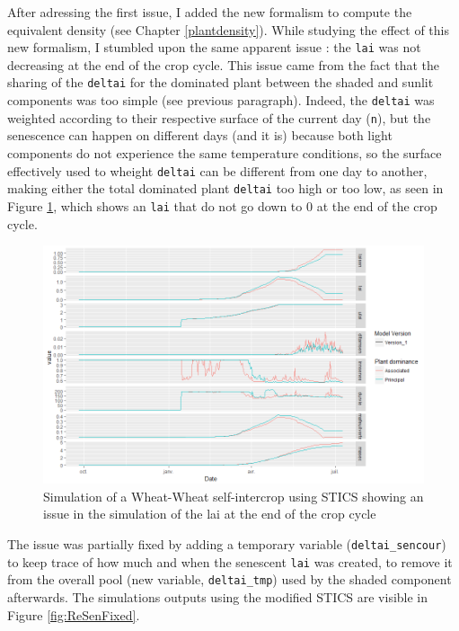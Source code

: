 \documentclass[]{book}
\begin{document}
After adressing the first issue, I added the new formalism to compute the equivalent density (see Chapter \ref{plantdensity}). While studying the effect of this new formalism, I stumbled upon the same apparent issue : the \texttt{lai} was not decreasing at the end of the crop cycle. This issue came from the fact that the sharing of the \texttt{deltai} for the dominated plant between the shaded and sunlit components was too simple (see previous paragraph). Indeed, the \texttt{deltai} was weighted according to their respective surface of the current day (\texttt{n}), but the senescence can happen on different days (and it is) because both light components do not experience the same temperature conditions, so the surface effectively used to wheight \texttt{deltai} can be different from one day to another, making either the total dominated plant \texttt{deltai} too high or too low, as seen in Figure \ref{fig:ReSen}, which shows an \texttt{lai} that do not go down to 0 at the end of the crop cycle.

\begin{figure}
\centering
\includegraphics{img/ReSen.png}
\caption{\label{fig:ReSen}Simulation of a Wheat-Wheat self-intercrop using STICS showing an issue in the simulation of the lai at the end of the crop cycle}
\end{figure}

The issue was partially fixed by adding a temporary variable (\texttt{deltai\_sencour}) to keep trace of how much and when the senescent \texttt{lai} was created, to remove it from the overall pool (new variable, \texttt{deltai\_tmp}) used by the shaded component afterwards. The simulations outputs using the modified STICS are visible in Figure \ref{fig:ReSenFixed}.
\end{document}
